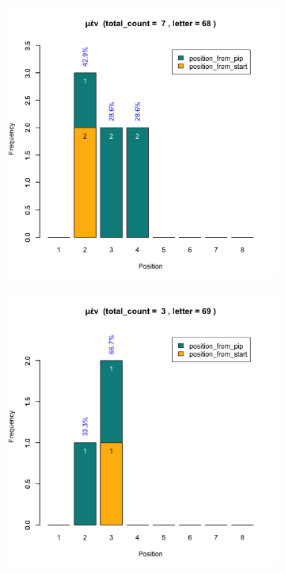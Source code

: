 \documentclass[a4paper]{article}
\begin{document}
\begin{figure}
\begin{subfigure}{0.45\textwidth}
\end{subfigure}
\begin{subfigure}{0.45\textwidth}
\centering
\includegraphics[width=1\linewidth]{../../data/output/paul_R_par/plots/par5_lt68.png}
\end{subfigure}
\begin{subfigure}{0.45\textwidth}
\centering
\includegraphics[width=1\linewidth]{../../data/output/paul_R_par/plots/par5_lt69.png}

\end{subfigure}
\end{figure}
\end{document}
